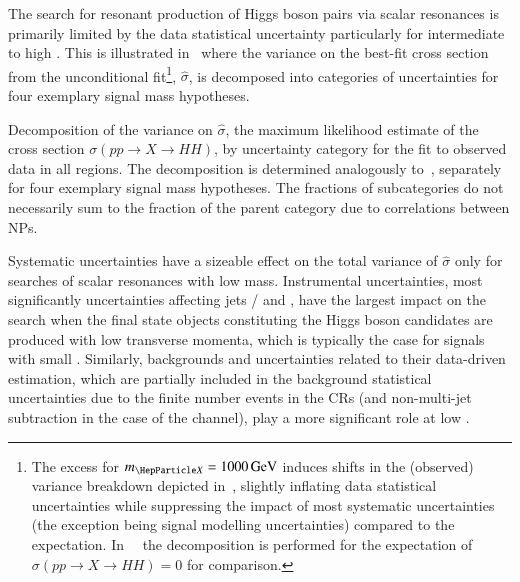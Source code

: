 The search for resonant production of Higgs boson pairs via scalar resonances is
primarily limited by the data statistical uncertainty particularly for
intermediate to high \mX. This is illustrated in~ where
the variance on the best-fit cross section from the unconditional
fit\footnote{The excess for $\mX = \SI{1000}{\GeV}$ induces shifts in the
  (observed) variance breakdown depicted in~, slightly
  inflating data statistical uncertainties while suppressing the impact of most
  systematic uncertainties (the exception being signal modelling uncertainties)
  compared to the
  expectation. In~~
  the decomposition is performed for the expectation of
  $\sigma(pp \to X \to HH) = 0$ for comparison.}, $\hat{\sigma}$, is decomposed
into categories of uncertainties for four exemplary signal mass hypotheses.

\begin{table}[htbp]
  \centering

  \caption{Decomposition of the variance on $\hat{\sigma}$, the maximum
    likelihood estimate of the cross section $\sigma(pp \to X\to HH)$, by
    uncertainty category for the fit to observed data in all regions. The
    decomposition is determined analogously to~,
    separately for four exemplary signal mass hypotheses. The fractions of
    subcategories do not necessarily sum to the fraction of the parent category
    due to correlations between NPs.}%
  \label{tab:breakdown_res}

  

\end{table}

Systematic uncertainties have a sizeable effect on the total variance of
$\hat{\sigma}$ only for searches of scalar resonances with low
mass. Instrumental uncertainties, most significantly uncertainties affecting
jets / \pTmissAbs and \tauhadvis, have the largest impact on the search when the
final state objects constituting the Higgs boson candidates are produced with
low transverse momenta, which is typically the case for signals with small
\mX. Similarly, \faketauhadvis backgrounds and uncertainties related to their
data-driven estimation, which are partially included in the background
statistical uncertainties due to the finite number events in the CRs (and
non-multi-jet subtraction in the case of the \hadhad channel), play a more
significant role at low \mX.


